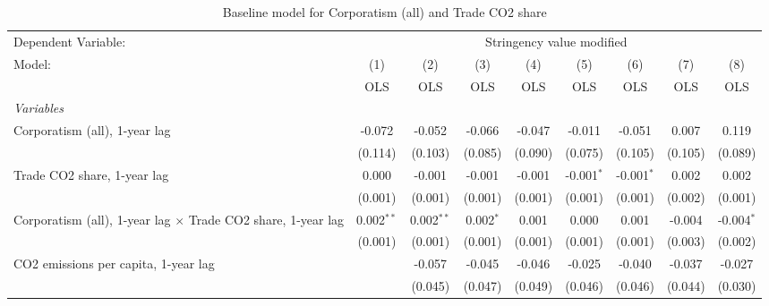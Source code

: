
\begin{table}[htbp]
   \caption{Baseline model for Corporatism (all) and Trade CO2 share}
   \centering
   \begin{tabular}{lcccccccc}
      \toprule
      Dependent Variable: & \multicolumn{8}{c}{Stringency value modified}\\
      Model:                                                              & (1)          & (2)          & (3)         & (4)     & (5)           & (6)           & (7)           & (8)\\  
                                                                          &  OLS         & OLS          & OLS         & OLS     & OLS           & OLS           & OLS           & OLS\\  
      \midrule
      \emph{Variables}\\
      Corporatism (all), 1-year lag                                       & -0.072       & -0.052       & -0.066      & -0.047  & -0.011        & -0.051        & 0.007         & 0.119\\   
                                                                          & (0.114)      & (0.103)      & (0.085)     & (0.090) & (0.075)       & (0.105)       & (0.105)       & (0.089)\\   
      Trade CO2 share, 1-year lag                                         & 0.000        & -0.001       & -0.001      & -0.001  & -0.001$^{*}$  & -0.001$^{*}$  & 0.002         & 0.002\\   
                                                                          & (0.001)      & (0.001)      & (0.001)     & (0.001) & (0.001)       & (0.001)       & (0.002)       & (0.001)\\   
      Corporatism (all), 1-year lag $\times$ Trade CO2 share, 1-year lag  & 0.002$^{**}$ & 0.002$^{**}$ & 0.002$^{*}$ & 0.001   & 0.000         & 0.001         & -0.004        & -0.004$^{*}$\\   
                                                                          & (0.001)      & (0.001)      & (0.001)     & (0.001) & (0.001)       & (0.001)       & (0.003)       & (0.002)\\   
      CO2 emissions per capita, 1-year lag                                &              & -0.057       & -0.045      & -0.046  & -0.025        & -0.040        & -0.037        & -0.027\\   
                                                                          &              & (0.045)      & (0.047)     & (0.049) & (0.046)       & (0.046)       & (0.044)       & (0.030)\\   

\end{tabular}
\end{table}
